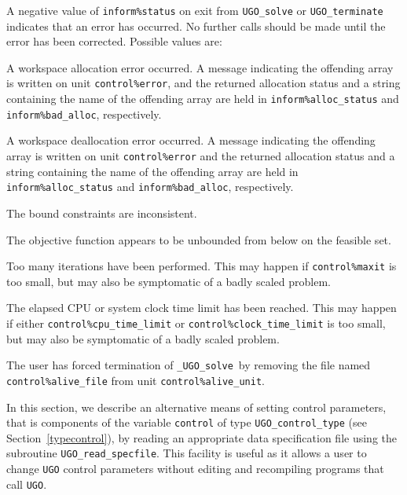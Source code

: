 \documentclass{galahad}
\newcommand{\packagename}{UGO}
\newcommand{\fullpackagename}{\libraryname\_\packagename}
\newcommand{\solver}{{\tt \fullpackagename\_solve}}
\begin{document}

\galerrors
A negative value of {\tt inform\%status} on exit from
{\tt \packagename\_solve}
or
{\tt \packagename\_terminate}
indicates that an error has occurred. No further calls should be made
until the error has been corrected. Possible values are:

\begin{description}

 A workspace allocation error occurred.
A message indicating the offending
array is written on unit {\tt control\%error}, and the returned allocation
status and a string containing the name of the offending array
are held in {\tt inform\%alloc\_\-status}
and {\tt inform\%bad\_alloc}, respectively.

 A workspace deallocation error occurred.
A message indicating the offending
array is written on unit {\tt control\%error} and the returned allocation
status and a string containing the name of the offending array
are held in {\tt inform\%alloc\_\-status}
and {\tt inform\%bad\_alloc}, respectively.

 The bound constraints are inconsistent.

  The objective function appears to be unbounded
 from below on the feasible set.

 Too many iterations have been performed.
  This may happen if
    {\tt control\%maxit} is too small, but may also be symptomatic of
    a badly scaled problem.

 The elapsed CPU or system clock time limit has been
    reached. This may happen if either {\tt control\%cpu\_time\_limit} or
    {\tt control\%clock\_time\_limit} is too small, but may also be symptomatic
    of a badly scaled problem.

 The user has forced termination of \solver\
     by removing the file named {\tt control\%a\-live\_file} from
     unit {\tt control\%alive\_unit}.

\end{description}


\galfeatures
\noindent In this section, we describe an alternative means of setting
control parameters, that is components of the variable {\tt control} of type
{\tt \packagename\_control\_type}
(see Section~\ref{typecontrol}),
by reading an appropriate data specification file using the
subroutine {\tt \packagename\_read\_specfile}. This facility
is useful as it allows a user to change  {\tt \packagename} control parameters
without editing and recompiling programs that call {\tt \packagename}.
\end{document}
